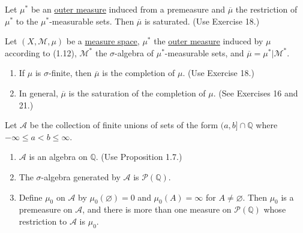 	\begin{exercise}[Folland 1.21]
		Let $\mu^*$ be an \hyperref[def:outer-measure]{outer measure} induced from a premeasure and $\overline{\mu}$ the restriction of $\mu^*$ to the $\mu^*$-measurable sets. Then $\overline{\mu}$ is saturated. (Use Exercise 18.)
	\end{exercise}
	\begin{solution}

	\end{solution}

	\begin{exercise}[Folland 1.22]
		Let $(X, \mathcal{M}, \mu)$ be a \hyperref[def:measure-space]{measure space}, $\mu^*$ the \hyperref[def:outer-measure]{outer measure} induced by $\mu$ according to (1.12), $\mathcal{M}^*$ the $\sigma$-algebra of $\mu^*$-measurable sets, and $\overline{\mu} = \mu^*|\mathcal{M}^*$.
		\begin{enumerate}[label=\textbf{\alph*.}]
			\item If $\mu$ is $\sigma$-finite, then $\overline{\mu}$ is the completion of $\mu$. (Use Exercise 18.)
			\item In general, $\overline{\mu}$ is the saturation of the completion of $\mu$. (See Exercises 16 and 21.)
		\end{enumerate}
	\end{exercise}
	\begin{solution}

	\end{solution}

	\begin{exercise}[Folland 1.23]
		Let $\mathcal{A}$ be the collection of finite unions of sets of the form $(a, b] \cap \mathbb{Q}$ where $-\infty \le a < b \le \infty$.
		\begin{enumerate}[label=\textbf{\alph*.}]
			\item $\mathcal{A}$ is an algebra on $\mathbb{Q}$. (Use Proposition 1.7.)
			\item The $\sigma$-algebra generated by $\mathcal{A}$ is $\mathcal{P}(\mathbb{Q})$.
			\item Define $\mu_0$ on $\mathcal{A}$ by $\mu_0(\varnothing) = 0$ and $\mu_0(A) = \infty$ for $A \neq \varnothing$. Then $\mu_0$ is a premeasure on $\mathcal{A}$, and there is more than one measure on $\mathcal{P}(\mathbb{Q})$ whose restriction to $\mathcal{A}$ is $\mu_0$.
		\end{enumerate}
	\end{exercise}
	\begin{solution}

	\end{solution}


